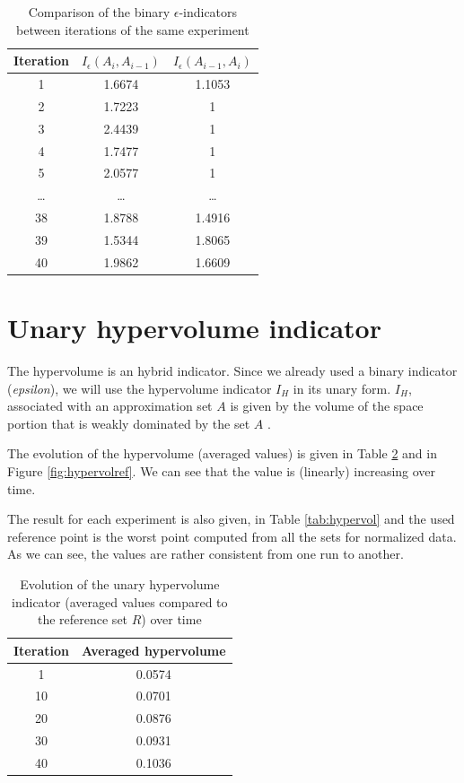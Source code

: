 \begin{table}[h!]
\begin{center}
\begin{tabular}{|c|c|c|}
\hline Iteration & $I_\epsilon(A_i, A_{i-1})$ & $I_\epsilon(A_{i-1}, A_i)$ \\ 
\hline 1 & 1.6674 & 1.1053 \\ 
\hline 2 & 1.7223 & 1 \\ 
\hline 3 & 2.4439 & 1 \\ 
\hline 4 & 1.7477 & 1 \\ 
\hline 5 & 2.0577 & 1 \\ 
\hline \dots & \dots & \dots \\
\hline 38 & 1.8788 & 1.4916 \\
\hline 39 & 1.5344 & 1.8065 \\ 
\hline 40 & 1.9862 & 1.6609 \\
\hline 
\end{tabular} 
\end{center}
\caption{Comparison of the binary $\epsilon$-indicators between iterations of the same experiment}
\label{tab:biepsiter}
\end{table}

\section{Unary hypervolume indicator}
The hypervolume is an hybrid indicator. Since we already used a binary indicator (\textit{epsilon}), we will use the hypervolume indicator $I_H$ in its unary form. $I_H$, associated with an approximation set $A$ is given by the volume of the space portion that is weakly dominated by the set $A$ \cite{talbi09}.

The evolution of the hypervolume (averaged values) is given in Table \ref{tab:hypervolref} and in Figure \ref{fig:hypervolref}. We can see that the value is (linearly) increasing over time.

The result for each experiment is also given, in Table \ref{tab:hypervol} and the used reference point is the worst point computed from all the sets for normalized data. As we can see, the values are rather consistent from one run to another.

\begin{table}[h!]
\begin{center}
\begin{tabular}{|c|c|}
\hline Iteration & Averaged hypervolume \\
\hline 1 & 0.0574 \\
\hline 10 & 0.0701 \\
\hline 20 & 0.0876 \\
\hline 30 & 0.0931 \\
\hline 40 & 0.1036 \\
\hline
\end{tabular}
\end{center}
\caption{Evolution of the unary hypervolume indicator (averaged values compared to the reference set $R$) over time}
\label{tab:hypervolref}
\end{table}

